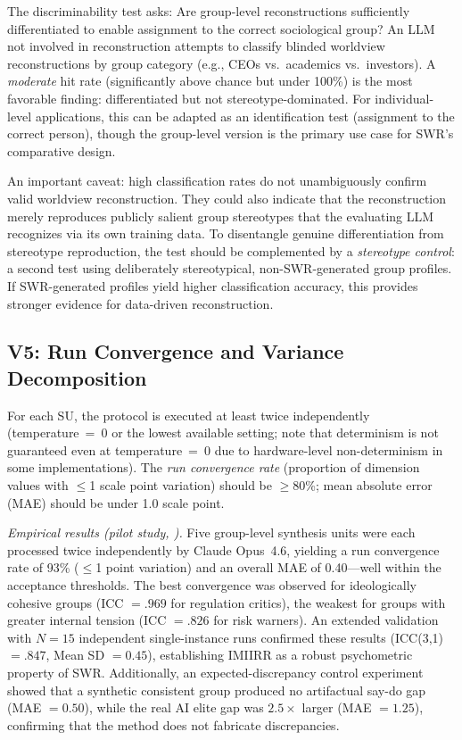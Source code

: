 \documentclass[11pt,a4paper]{article}
\theoremstyle{definition}
\theoremstyle{plain}
\theoremstyle{remark}
\begin{document}
The discriminability test asks: Are group-level reconstructions sufficiently differentiated to enable assignment to the correct sociological group? An LLM not involved in reconstruction attempts to classify blinded worldview reconstructions by group category (e.g., CEOs vs.\ academics vs.\ investors). A \emph{moderate} hit rate (significantly above chance but under 100\%) is the most favorable finding: differentiated but not stereotype-dominated. For individual-level applications, this can be adapted as an identification test (assignment to the correct person), though the group-level version is the primary use case for SWR's comparative design.

An important caveat: high classification rates do not unambiguously confirm valid worldview reconstruction. They could also indicate that the reconstruction merely reproduces publicly salient group stereotypes that the evaluating LLM recognizes via its own training data. To disentangle genuine differentiation from stereotype reproduction, the test should be complemented by a \emph{stereotype control}: a second test using deliberately stereotypical, non-SWR-generated group profiles. If SWR-generated profiles yield higher classification accuracy, this provides stronger evidence for data-driven reconstruction.

\subsection{V5: Run Convergence and Variance Decomposition}

For each SU, the protocol is executed at least twice independently (temperature~=~0 or the lowest available setting; note that determinism is not guaranteed even at temperature~=~0 due to hardware-level non-determinism in some implementations). The \emph{run convergence rate} (proportion of dimension values with $\leq$1 scale point variation) should be $\geq$80\%; mean absolute error (MAE) should be under 1.0 scale point.

\emph{Empirical results (pilot study, \citealp{Geiger2026b}).} Five group-level synthesis units were each processed twice independently by Claude Opus~4.6, yielding a run convergence rate of 93\% ($\leq$1 point variation) and an overall MAE of 0.40---well within the acceptance thresholds. The best convergence was observed for ideologically cohesive groups (ICC $= .969$ for regulation critics), the weakest for groups with greater internal tension (ICC $= .826$ for risk warners). An extended validation with $N = 15$ independent single-instance runs confirmed these results (ICC(3,1) $= .847$, Mean SD $= 0.45$), establishing IMIIRR as a robust psychometric property of SWR. Additionally, an expected-discrepancy control experiment showed that a synthetic consistent group produced no artifactual say-do gap (MAE $= 0.50$), while the real AI elite gap was $2.5\times$ larger (MAE $= 1.25$), confirming that the method does not fabricate discrepancies.
\end{document}
